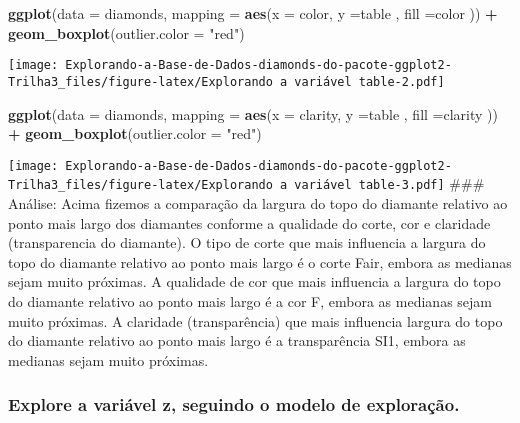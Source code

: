 \documentclass[
]{article}
\newenvironment{Shaded}{\begin{snugshade}}{\end{snugshade}}
\newcommand{\DataTypeTok}[1]{\textcolor[rgb]{0.13,0.29,0.53}{#1}}
\newcommand{\KeywordTok}[1]{\textcolor[rgb]{0.13,0.29,0.53}{\textbf{#1}}}
\newcommand{\NormalTok}[1]{#1}
\newcommand{\OperatorTok}[1]{\textcolor[rgb]{0.81,0.36,0.00}{\textbf{#1}}}
\newcommand{\StringTok}[1]{\textcolor[rgb]{0.31,0.60,0.02}{#1}}
\begin{document}
\begin{Shaded}
\begin{Highlighting}[]
\KeywordTok{ggplot}\NormalTok{(}\DataTypeTok{data =}\NormalTok{ diamonds, }\DataTypeTok{mapping =} \KeywordTok{aes}\NormalTok{(}\DataTypeTok{x =}\NormalTok{ color, }\DataTypeTok{y =}\NormalTok{table , }\DataTypeTok{fill =}\NormalTok{color )) }\OperatorTok{+}\StringTok{ }\KeywordTok{geom_boxplot}\NormalTok{(}\DataTypeTok{outlier.color =} \StringTok{"red"}\NormalTok{)}
\end{Highlighting}
\end{Shaded}

\texttt{[image: Explorando-a-Base-de-Dados-diamonds-do-pacote-ggplot2-Trilha3\_files/figure-latex/Explorando a variável table-2.pdf]}

\begin{Shaded}
\begin{Highlighting}[]
\KeywordTok{ggplot}\NormalTok{(}\DataTypeTok{data =}\NormalTok{ diamonds, }\DataTypeTok{mapping =} \KeywordTok{aes}\NormalTok{(}\DataTypeTok{x =}\NormalTok{ clarity, }\DataTypeTok{y =}\NormalTok{table , }\DataTypeTok{fill =}\NormalTok{clarity )) }\OperatorTok{+}\StringTok{ }\KeywordTok{geom_boxplot}\NormalTok{(}\DataTypeTok{outlier.color =} \StringTok{"red"}\NormalTok{)}
\end{Highlighting}
\end{Shaded}

\texttt{[image: Explorando-a-Base-de-Dados-diamonds-do-pacote-ggplot2-Trilha3\_files/figure-latex/Explorando a variável table-3.pdf]}
\#\#\# Análise: Acima fizemos a comparação da largura do topo do
diamante relativo ao ponto mais largo dos diamantes conforme a qualidade
do corte, cor e claridade (transparencia do diamante). O tipo de corte
que mais influencia a largura do topo do diamante relativo ao ponto mais
largo é o corte Fair, embora as medianas sejam muito próximas. A
qualidade de cor que mais influencia a largura do topo do diamante
relativo ao ponto mais largo é a cor F, embora as medianas sejam muito
próximas. A claridade (transparência) que mais influencia largura do
topo do diamante relativo ao ponto mais largo é a transparência SI1,
embora as medianas sejam muito próximas.

\hypertarget{explore-a-variuxe1vel-z-seguindo-o-modelo-de-explorauxe7uxe3o.}{%
\subsubsection{Explore a variável z, seguindo o modelo de
exploração.}\label{explore-a-variuxe1vel-z-seguindo-o-modelo-de-explorauxe7uxe3o.}}
\end{document}
